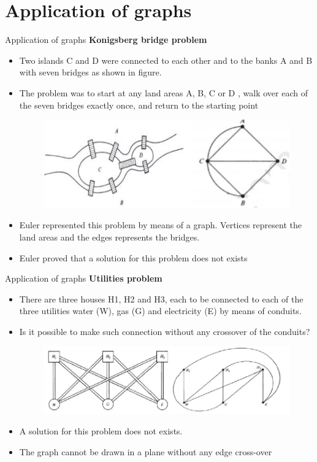 \documentclass{beamer}
\begin{document}
\section{Application of graphs}
\begin{frame}{Application of graphs}
\textbf{Konigsberg bridge problem}
\begin{itemize}
	\item Two islands C and D were connected to
	each other and to the banks A and B with seven bridges as shown in
	figure. 
	\item The problem was to start at any land areas A, B, C or D , walk
	over each of the seven bridges exactly once, and return to the starting
	point
	\begin{figure}
		\includegraphics[scale=.4]{img/m10}
	\end{figure}
\item Euler represented this problem by means of a graph. Vertices
represent the land areas and the edges represents the bridges.
\item Euler proved that a solution for this problem does not exists
\end{itemize}
\end{frame}
\begin{frame}{Application of graphs}
	\textbf{Utilities problem}
	\begin{itemize}
		\item There are three houses H1, H2 and H3, each to be connected to each of the three
		utilities water (W), gas (G) and electricity (E) by means of conduits. 
		\item Is it possible to make such connection without any crossover of the conduits?
		\begin{figure}
			\includegraphics[scale=.4]{img/m11}
		\end{figure}
		\item A solution for this problem does not exists.
		\item The graph cannot be drawn in a plane without any edge cross-over
	\end{itemize}
\end{frame}
\end{document}
